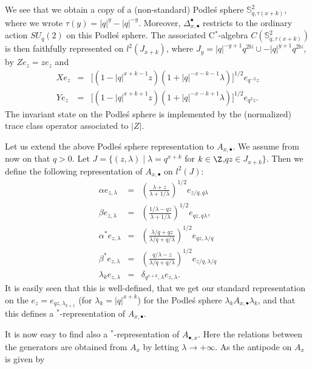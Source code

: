 We see that we obtain a copy of a (non-standard) Podle\'{s} sphere $\mathbb{S}_{q,\tau(x+k)}^2$, where we wrote $\tau(y) = |q|^{y}-|q|^{-y}$. Moreover, $\Delta_{x,\bullet}^{\bullet}$ restricts to the ordinary action $SU_q(2)$ on this Podle\'{s} sphere. The associated C$^*$-algebra $C(\mathbb{S}_{q,\tau(x+k)}^2)$ is then faithfully represented on $l^2(J_{x+k})$, where $J_y = |q|^{-y+1}q^{2\mathbb{N}}\cup -|q|^{y+1}q^{2\mathbb{N}}$, by $Ze_z = z e_{z}$ and \begin{eqnarray*} Xe_{z} &=& \lbrack (1-|q|^{x+k-1}z)(1+|q|^{-x-k-1}\lambda)\rbrack^{1/2}e_{q^{-2}z}\\ Ye_{z} &=& \lbrack (1-|q|^{x+k+1}z)(1+|q|^{-x-k+1}\lambda)\rbrack^{1/2}e_{q^2z}.\end{eqnarray*} The invariant state on the Podle\'{s} sphere is implemented by the (normalized) trace class operator associated to $|Z|$. 

Let us extend the above Podle\'{s} sphere representation to $A_{x,\bullet}$. We assume from now on that $q>0$. Let $J =\{(z,\lambda)\mid \lambda = q^{x+k}$ for $k\in \Z$,$qz \in J_{x+k}\}$. Then we define the following representation of $A_{x,\bullet}$ on $l^2(J)$: \begin{eqnarray*} \alpha e_{z,\lambda} &=&  \left(\frac{\lambda+z}{\lambda+1/\lambda}\right)^{1/2}e_{z/q,q\lambda}\\ \beta e_{z,\lambda} &=& \left( \frac{1/\lambda-qz}{\lambda+1/\lambda}\right)^{1/2}e_{qz,q\lambda},  \\  \alpha^* e_{z,\lambda} &=&  \left(\frac{\lambda/q+qz}{\lambda/q+q/\lambda}\right)^{1/2}e_{qz,\lambda/q} \\ \beta^* e_{z,\lambda} &=& \left( \frac{q/\lambda-z}{\lambda/q+q/\lambda}\right)^{1/2}e_{z/q,\lambda/q}
 \\ \lambda_k e_{z,\lambda} &=& \delta_{q^{x+k},\lambda}e_{z,\lambda}. \end{eqnarray*} It is easily seen that this is well-defined, that we get our standard representation on the $e_{z} = e_{qz,\lambda_{k+1}}$ (for $\lambda_k = |q|^{x+k}$) for the Podle\'{s} sphere $\lambda_k A_{x,\bullet}\lambda_k$, and that this defines a $^*$-representation of $A_{x,\bullet}$. 


It is now easy to find also a $^*$-representation of $A_{\bullet,x}$. Here the relations between the generators are obtained from $A_{x}$ by letting $\lambda\rightarrow +\infty$.  As the antipode on $A_x$ is given by 




